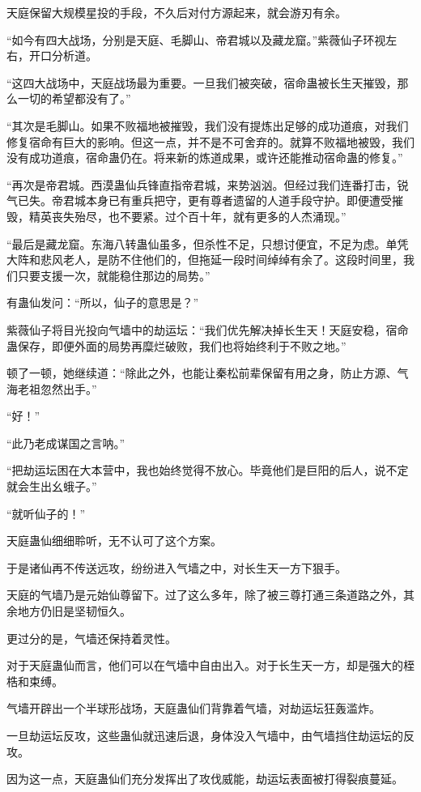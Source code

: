 \begin{this_body}
天庭保留大规模星投的手段，不久后对付方源起来，就会游刃有余。

“如今有四大战场，分别是天庭、毛脚山、帝君城以及藏龙窟。”紫薇仙子环视左右，开口分析道。

“这四大战场中，天庭战场最为重要。一旦我们被突破，宿命蛊被长生天摧毁，那么一切的希望都没有了。”

“其次是毛脚山。如果不败福地被摧毁，我们没有提炼出足够的成功道痕，对我们修复宿命有巨大的影响。但这一点，并不是不可舍弃的。就算不败福地被毁，我们没有成功道痕，宿命蛊仍在。将来新的炼道成果，或许还能推动宿命蛊的修复。”

“再次是帝君城。西漠蛊仙兵锋直指帝君城，来势汹汹。但经过我们连番打击，锐气已失。帝君城本身已有重兵把守，更有尊者遗留的人道手段守护。即便遭受摧毁，精英丧失殆尽，也不要紧。过个百十年，就有更多的人杰涌现。”

“最后是藏龙窟。东海八转蛊仙虽多，但杀性不足，只想讨便宜，不足为虑。单凭大阵和悲风老人，是防不住他们的，但拖延一段时间绰绰有余了。这段时间里，我们只要支援一次，就能稳住那边的局势。”

有蛊仙发问：“所以，仙子的意思是？”

紫薇仙子将目光投向气墙中的劫运坛：“我们优先解决掉长生天！天庭安稳，宿命蛊保存，即便外面的局势再糜烂破败，我们也将始终利于不败之地。”

顿了一顿，她继续道：“除此之外，也能让秦松前辈保留有用之身，防止方源、气海老祖忽然出手。”

“好！”

“此乃老成谋国之言呐。”

“把劫运坛困在大本营中，我也始终觉得不放心。毕竟他们是巨阳的后人，说不定就会生出幺蛾子。”

“就听仙子的！”

天庭蛊仙细细聆听，无不认可了这个方案。

于是诸仙再不传送远攻，纷纷进入气墙之中，对长生天一方下狠手。

天庭的气墙乃是元始仙尊留下。过了这么多年，除了被三尊打通三条道路之外，其余地方仍旧是坚韧恒久。

更过分的是，气墙还保持着灵性。

对于天庭蛊仙而言，他们可以在气墙中自由出入。对于长生天一方，却是强大的桎梏和束缚。

气墙开辟出一个半球形战场，天庭蛊仙们背靠着气墙，对劫运坛狂轰滥炸。

一旦劫运坛反攻，这些蛊仙就迅速后退，身体没入气墙中，由气墙挡住劫运坛的反攻。

因为这一点，天庭蛊仙们充分发挥出了攻伐威能，劫运坛表面被打得裂痕蔓延。


\end{this_body}
